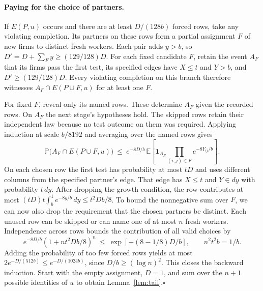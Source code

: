 \documentclass[11pt]{article}
\newcommand{\E}{\mathbb E}
\newcommand{\Prob}{\mathbb P}
\newcommand{\ind}{\mathbf 1}
\begin{document}
\paragraph{Paying for the choice of partners.}
If $E(P,u)$ occurs and there are at least $D/(128b)$ forced rows, take any
violating completion. Its partners on these rows form a partial assignment $F$
of new firms to distinct fresh workers. Each pair adds $y>b$, so
$D'=D+\sum_{F}y\ge(129/128)D$. For each fixed candidate $F$, retain the event
$A_F$ that its firms pass the first test, its specified edges have $X\le t$ and
$Y>b$, and $D'\ge(129/128)D$. Every violating completion on this branch
therefore witnesses $A_F\cap E(P\cup F,u)$ for at least one $F$.

For fixed $F$, reveal only its named rows. These determine $A_F$ given the
recorded rows. On $A_F$ the next stage's hypotheses hold. The skipped rows
retain their independent law because no test outcome on them was required.
Applying induction at scale $b/8192$ and averaging over the named rows gives
\[
 \Prob\big(A_F\cap E(P\cup F,u)\big)
 \ \le\ e^{-8D/b}\,\E\!\left[\ind_{A_F}\prod_{(i,j)\in F}e^{-8Y_{ij}/b}\right].
\]
On each chosen row the first test has probability at most $tD$ and uses
different columns from the specified partner's edge. That edge has $X\le t$
and $Y\in dy$ with probability $t\,dy$. After dropping the growth condition,
the row contributes at most $(tD)t\int_b^1e^{-8y/b}\,dy\le t^2Db/8$.
To bound the nonnegative sum over $F$, we can now also drop the requirement
that the chosen partners be distinct. Each unused row can be
skipped or can name one of at most $n$ fresh workers. Independence across
rows bounds the contribution of all valid choices by
\[
 e^{-8D/b}(1+nt^2Db/8)^n
 \ \le\ \exp[-(8-1/8)D/b],
 \qquad n^2t^2 b=1/b .
\]
Adding the probability of too few forced rows yields at most
$2e^{-D/(512b)}\le e^{-D/(1024b)}$, since $D/b\ge(\log n)^2$.
This closes the backward induction. Start with the
empty assignment, $D=1$, and sum over the $n+1$ possible identities of
$u$ to obtain Lemma~\ref{lem:tail}.\hfill$\square$
\end{document}
